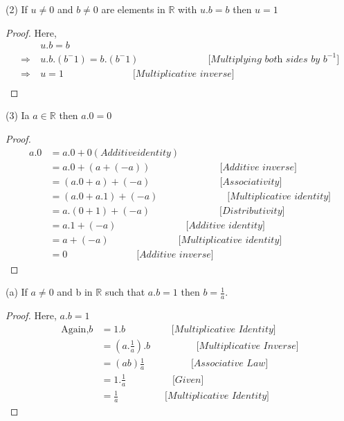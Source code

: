 \documentclass{article}
\newcommand{\Rw}{\Rightarrow}
\newcommand{\hs}{\hspace}
\begin{document}
\begin{theorem}{(2)}{}
    If $u \neq 0$ and $b \neq 0$ are elements in $\mathbb{R}$ with $u.b=b$ then $u=1$
    \begin{proof}
        Here, 
        \begin{align*}
            &u.b=b\\
            \Rw \ & u.b.(b^-1)=b.(b^-1)\hs{3cm}\textit{[Multiplying both sides by $b^{-1}$]}\\
            \Rw \ & u=1 \hs{3cm}\textit{[Multiplicative inverse]}\\
        \end{align*}
    \end{proof}
\end{theorem}
\begin{theorem}{(3)}{}
    Ia $a\in \mathbb{R}$ then $a.0=0$
    \begin{proof}
        \begin{align*}
            a.0 & =a.0+0 (Additive identity)\\
                & =a.0+(a+(-a)) \hs{3cm}\textit{[Additive inverse]}\\
                &=(a.0+a)+(-a) \hs{3cm}\textit{[Associativity]}\\
                &=(a.0+a.1)+(-a) \hs{3cm}\textit{[Multiplicative identity]}\\
                &=a.(0+1)+(-a)\hs{3cm}\textit{[Distributivity]}\\
                &=a.1+(-a) \hs{3cm}\textit{[Additive identity]}\\
                &=a+(-a) \hs{3cm}\textit{[Multiplicative identity]}\\
                &=0 \hs{3cm}\textit{[Additive inverse]}
        \end{align*}
    \end{proof}
\end{theorem}
\begin{theorem}{(a)}{}
    If $a\neq 0$ and b in $\mathbb{R}$ such that $a.b=1$ then $b=\frac{1}{a}$.
    \begin{proof}
        Here, $a.b=1$
        \begin{align*}
            \text{Again,} b&=1.b \hs{2cm}\textit{[Multiplicative Identity]}\\
            &= (a.\frac{1}{a}).b \hs{2cm}\textit{[Multiplicative Inverse]}\\
            &= (ab)\frac{1}{a} \hs{2cm}\textit{[Associative Law]}\\
            &= 1. \frac{1}{a} \hs{2cm} \textit{[Given]}\\
            &=\frac{1}{a} \hs{2cm}\textit{[Multiplicative Identity]}
        \end{align*}
    \end{proof}
\end{theorem}
\end{document}
